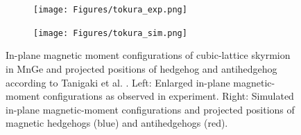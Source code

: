 \documentclass [a4paper, 12pt]{article}
\begin{document}
\begin{figure}[h]
	\centering
	\begin{subfigure}{.5\textwidth}
		  \centering
		  \texttt{[image: Figures/tokura\_exp.png]}
		  \label{fig:sub1}
	\end{subfigure}%
	\begin{subfigure}{.5\textwidth}
		  \centering
		  \texttt{[image: Figures/tokura\_sim.png]}
                  \label{fig:sub2}
	\end{subfigure}
	\caption{In-plane magnetic moment configurations of cubic-lattice skyrmion 
		in MnGe and projected positions of hedgehog and antihedgehog according to
	        Tanigaki et al. \cite{tanigaki_real-space_2015}.
		Left: Enlarged in-plane magnetic-moment configurations as observed in experiment.
		Right: Simulated in-plane magnetic-moment configurations and projected
		positions of magnetic hedgehogs (blue) and antihedgehogs (red).}
		
	\label{fig:tokura_results}
\end{figure}
\end{document}
